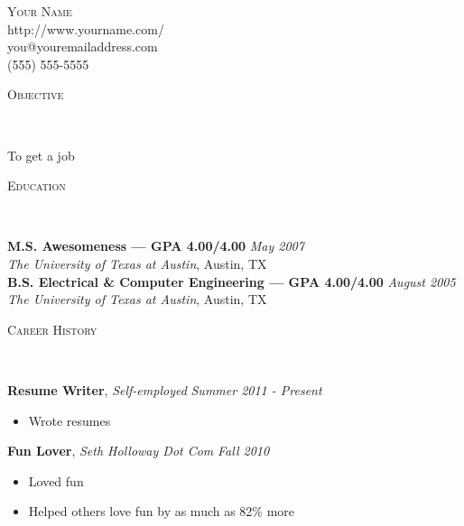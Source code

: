 \documentclass[9pt]{article}
\newenvironment{changemargin}[2]{%
  \begin{list}{}{%
    \setlength{\topsep}{0pt}%
    \setlength{\leftmargin}{#1}%
    \setlength{\rightmargin}{#2}%
    \setlength{\listparindent}{\parindent}%
    \setlength{\itemindent}{\parindent}%
    \setlength{\parsep}{\parskip}%
  }%
  \item[]}{\end{list}
}
\newcommand{\lineover}{
	\begin{changemargin}{-0.05in}{-0.05in}
		\vspace*{-8pt}
		\hrulefill \\
		\vspace*{-2pt}
	\end{changemargin}
}
\newcommand{\header}[1]{
	\begin{changemargin}{-0.5in}{-0.5in}
		\scshape{#1}\\
  	\lineover
	\end{changemargin}
}
\newcommand{\contact}[4]{
	\begin{changemargin}{-0.5in}{-0.5in}
		\begin{center}
			{\Large \scshape {#1}}\\ \smallskip
			{#2}\\ \smallskip 
			{#3}\\ \smallskip
			{#4}\smallskip
		\end{center}
	\end{changemargin}
}
\newenvironment{body} {
	\vspace*{-16pt}
	\begin{changemargin}{-0.25in}{-0.5in}
  }	
	{\end{changemargin}
}
\begin{document}
\contact{Your Name}{http://www.yourname.com/}{you@youremailaddress.com}{(555) 555-5555}


\header{Objective}

\begin{body}
	\vspace{14pt}
	To get a job
\end{body}

\smallskip


\header{Education}

\begin{body}
	\vspace{14pt}
	\textbf{M.S. Awesomeness --- GPA 4.00/4.00}{} \hfill \emph{May 2007}{} \\
	\emph{The University of Texas at Austin}, Austin, TX{} \\
  \medskip
	\textbf{B.S. Electrical \& Computer Engineering --- GPA 4.00/4.00} \hfill \emph{August 2005} \\
	\emph{The University of Texas at Austin}, Austin, TX\\
\end{body}

\smallskip


\header{Career History}

\begin{body}
	\vspace{14pt}
	\textbf{Resume Writer}, \emph{Self-employed} \hfill \emph{Summer 2011 - Present}\\
	\vspace*{-4pt}
	\begin{itemize} \itemsep -0pt  %
		\item Wrote resumes
	\end{itemize}

	\textbf {Fun Lover}, \emph{Seth Holloway Dot Com} \hfill \emph{Fall 2010}\\
	\vspace*{-4pt}
	\begin{itemize} \itemsep -0pt
		\item Loved fun
		\item Helped others love fun by as much as 82\% more
	\end{itemize}
\end{body}
\end{document}
